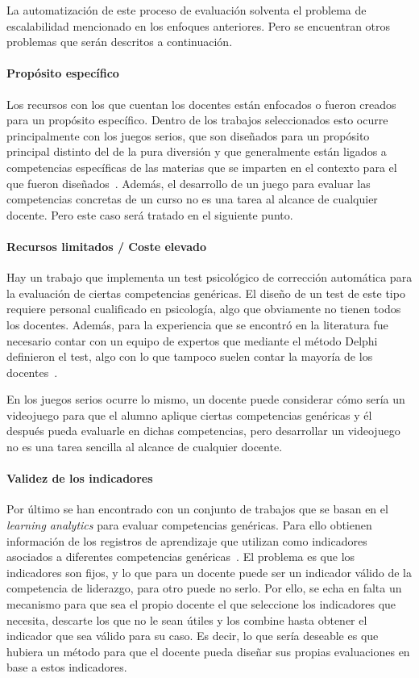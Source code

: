 La automatización de este proceso de evaluación solventa el problema de escalabilidad mencionado en los enfoques anteriores. Pero se encuentran otros problemas que serán descritos a continuación.


\paragraph*{Propósito específico}
Los recursos con los que cuentan los docentes están enfocados o fueron creados para un propósito específico. Dentro de los trabajos seleccionados esto ocurre principalmente con los juegos serios, que son diseñados para un propósito principal distinto del de la pura diversión y que generalmente están ligados a competencias específicas de las materias que se imparten en el contexto para el que fueron diseñados~\cite{bedek2011behavioral,guenaga2013serious}. Además, el desarrollo de un juego para evaluar las competencias concretas de un curso no es una tarea al alcance de cualquier docente. Pero este caso será tratado en el siguiente punto.


\paragraph*{Recursos limitados / Coste elevado}
Hay un trabajo que implementa un test psicológico de corrección automática para la evaluación de ciertas competencias genéricas. El diseño de un test de este tipo requiere personal cualificado en psicología, algo que obviamente no tienen todos los docentes. Además, para la experiencia que se encontró en la literatura fue necesario contar con un equipo de expertos que mediante el método Delphi definieron el test, algo con lo que tampoco suelen contar la mayoría de los docentes~\cite{andre2011formal}.

En los juegos serios ocurre lo mismo, un docente puede considerar cómo sería un videojuego para que el alumno aplique ciertas competencias genéricas y él después pueda evaluarle en dichas competencias, pero desarrollar un videojuego no es una tarea sencilla al alcance de cualquier docente.

\paragraph*{Validez de los indicadores}
Por último se han encontrado con un conjunto de trabajos que se basan en el \emph{learning analytics} para evaluar competencias genéricas. Para ello obtienen información de los registros de aprendizaje que utilizan como indicadores asociados a diferentes competencias genéricas~\cite{fidalgo:2015,rayon2014web}. El problema es que los indicadores son fijos, y lo que para un docente puede ser un indicador válido de la competencia de liderazgo, para otro puede no serlo. Por ello, se echa en falta un mecanismo para que sea el propio docente el que seleccione los indicadores que necesita, descarte los que no le sean útiles y los combine hasta obtener el indicador que sea válido para su caso. Es decir, lo que sería deseable es que hubiera un método para que el docente pueda diseñar sus propias evaluaciones en base a estos indicadores.

